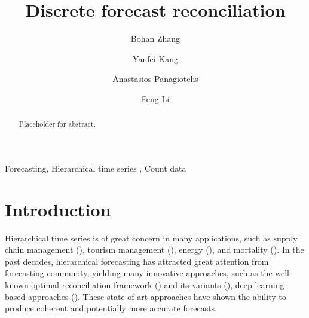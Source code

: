 \documentclass[a4paper,review,12pt,authoryear]{elsarticle}
\begin{document}
\begin{frontmatter}

  \title{Discrete forecast reconciliation}

  \author[label1]{Bohan Zhang}
  \address[label1]{School of Economics and Management, Beihang University, Beijing, China}
  
  \author[label1]{Yanfei Kang}
  \author[label2]{Anastasios Panagiotelis}
  
  \author[label3]{Feng Li}

  \address[label2]{The University of Sydney Business School, NSW 2006, Australia}
  \address[label3]{School of Statistics and Mathematics, Central University of Finance and Economics, Beijing, China}

  \begin{abstract}
    Placeholder for abstract.
  \end{abstract}

  \begin{keyword}
  Forecasting\sep
  Hierarchical time series \sep
  Count data
  \end{keyword}
  
\end{frontmatter}

\newpage

\section{Introduction}

Hierarchical time series is of great concern in many applications, such as supply chain management (\citealp{babaiDemandForecastingSupply2022}), tourism management (\citealp{kourentzesCrosstemporalCoherentForecasts2019}), energy (\citealp{nystrupTemporalHierarchiesAutocorrelation2020}), and mortality (\citealp{liHierarchicalMortalityForecasting2022}).
In the past decades, hierarchical forecasting has attracted great attention from forecasting community, yielding many innovative approaches, such as the well-known optimal reconciliation framework (\citealp{hyndmanOptimalCombinationForecasts2011, wickramasuriyaOptimalForecastReconciliation2019, panagiotelisProbabilisticForecastReconciliation2022}) and its variants (), deep learning based approaches (\citealp{rangapuramEndtoEndLearningCoherent2021}).
These state-of-art approaches have shown the ability to produce coherent and potentially more accurate forecasts.
\end{document}
